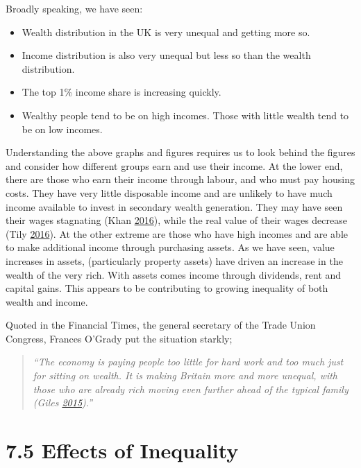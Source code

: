 \documentclass[]{tufte-handout}
\providecommand{\tightlist}{%
  \setlength{\itemsep}{0pt}\setlength{\parskip}{0pt}}
\begin{document}
Broadly speaking, we have seen:

\begin{itemize}
\tightlist
\item
  Wealth distribution in the UK is very unequal and getting more so.
\item
  Income distribution is also very unequal but less so than the wealth
  distribution.
\item
  The top 1\% income share is increasing quickly.
\item
  Wealthy people tend to be on high incomes. Those with little wealth
  tend to be on low incomes.
\end{itemize}

Understanding the above graphs and figures requires us to look behind
the figures and consider how different groups earn and use their income.
At the lower end, there are those who earn their income through labour,
and who must pay housing costs. They have very little disposable income
and are unlikely to have much income available to invest in secondary
wealth generation. They may have seen their wages stagnating (Khan
\protect\hyperlink{ref-Khan2016}{2016}), while the real value of their
wages decrease (Tily \protect\hyperlink{ref-Tily2016}{2016}). At the
other extreme are those who have high incomes and are able to make
additional income through purchasing assets. As we have seen, value
increases in assets, (particularly property assets) have driven an
increase in the wealth of the very rich. With assets comes income
through dividends, rent and capital gains. This appears to be
contributing to growing inequality of both wealth and income.

Quoted in the Financial Times, the general secretary of the Trade Union
Congress, Frances O'Grady put the situation starkly;

\begin{quote}
\emph{``The economy is paying people too little for hard work and too
much just for sitting on wealth. It is making Britain more and more
unequal, with those who are already rich moving even further ahead of
the typical family (Giles \protect\hyperlink{ref-Giles2015}{2015}).'' }
\end{quote}

\hypertarget{effects-of-inequality}{%
\section{7.5 Effects of Inequality}\label{effects-of-inequality}}
\end{document}
